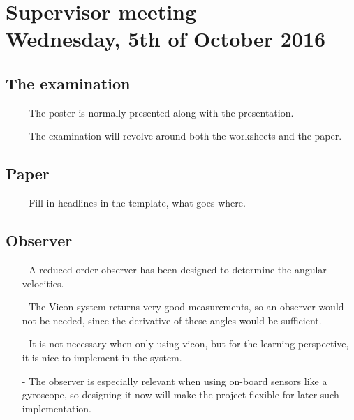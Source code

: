 
\renewcommand{\vec}[1]{\boldsymbol{\mathbf{#1}}}

\renewcommand\chaptername{KAPITEL}
\renewcommand\contentsname{Indhold}
\renewcommand\figurename{Figur}
\renewcommand\tablename{Tabel}

\section*{Supervisor meeting\\ \small Wednesday, 5th of October 2016}

\subsection{The examination}
\begin{itemize}
  \item[-] The poster is normally presented along with the presentation.
  \item[-] The examination will revolve around both the worksheets and the paper.
\end{itemize}

\subsection{Paper}
\begin{itemize}
  \item[-] Fill in headlines in the template, what goes where.
\end{itemize}

\subsection{Observer}
\begin{itemize}
  \item[-] A reduced order observer has been designed to determine the angular velocities.
  \item[-] The Vicon system returns very good measurements, so an observer would not be needed, since the derivative of these angles would be sufficient.
  \item[-] It is not necessary when only using vicon, but for the learning perspective, it is nice to implement in the system.
  \item[-] The observer is especially relevant when using on-board sensors like a gyroscope, so designing it now will make the project flexible for later such implementation.
\end{itemize}

